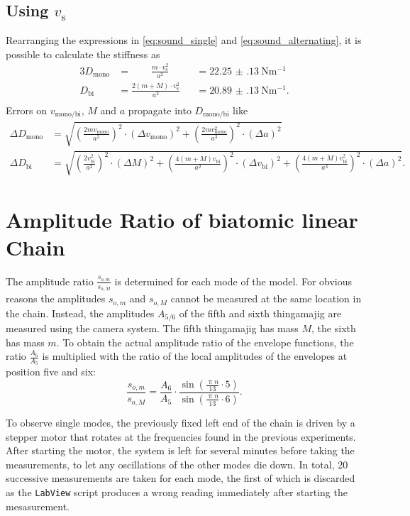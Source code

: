 \subsection{Using $v_\text{s}$}
Rearranging the expressions in \ref{eq:sound_single} and \ref{eq:sound_alternating}, it is possible to calculate the stiffness as
\begin{alignat*}{3}
	D_\text{mono} &=\qquad \frac{m\cdot v_\text{s}^2}{a^2} &&=  \SI{22.25(13)}{\newton\meter^{-1}} \\
	D_\text{bi} &= \frac{2(m+M)\cdot v_\text{s}^2}{a^2} &&= \SI{20.89(13)}{\newton\meter^{-1}}. \\
\end{alignat*}
Errors on $v_\text{mono/bi}$, $M$ and $a$ propagate into $D_\text{mono/bi}$ like
\begin{align*}
	\Delta D_\text{mono} &= \sqrt{ \left(\frac{2mv_\text{mono}}{a^2}\right)^2 \cdot(\Delta v_\text{mono})^2 + \left(\frac{2mv_\text{mono}^2}{a^3}\right)^2 \cdot (\Delta a)^2 } \\
	\Delta D_\text{bi} &= \sqrt{ \left(\frac{2v_\text{bi}^2}{a^2}\right)^2 \cdot (\Delta M)^2
	+ \left(\frac{4(m+M)v_\text{bi}}{a^2}\right)^2 \cdot (\Delta v_\text{bi})^2
	+ \left(\frac{4(m+M)v_\text{bi}^2}{a^3}\right)^2 \cdot (\Delta a)^2 }.
\end{align*}

\section{Amplitude Ratio of biatomic linear Chain}
The amplitude ratio $\frac{s_{o,m}}{s_{o,M}}$ is determined for each mode of the model.
For obvious reasons the amplitudes $s_{o,m}$ and $s_{o,M}$ cannot be measured at the same location in the chain.
Instead, the amplitudes $A_{5/6}$ of the fifth and sixth thingamajig are measured using the camera system.
The fifth thingamajig has mass $M$, the sixth has mass $m$.
To obtain the actual amplitude ratio of the envelope functions, the ratio $\frac{A_{6}}{A_{5}}$ is multiplied with the ratio of the local amplitudes of the envelopes at position five and six:
\begin{equation*}
	\frac{s_{o,m}}{s_{o,M}} = \frac{A_{6}}{A_{5}} \cdot \frac{\sin(\frac{\uppi n}{13} \cdot 5)}{\sin(\frac{\uppi n}{13} \cdot 6)}.
\end{equation*}

To observe single modes, the previously fixed left end of the chain is driven by a stepper motor that rotates at the frequencies found in the previous experiments.
After starting the motor, the system is left for several minutes before taking the measurements, to let any oscillations of the other modes die down.
In total, 20 successive measurements are taken for each mode, the first of which is discarded as the \texttt{LabView} script produces a wrong reading immediately after starting the mesasurement.


